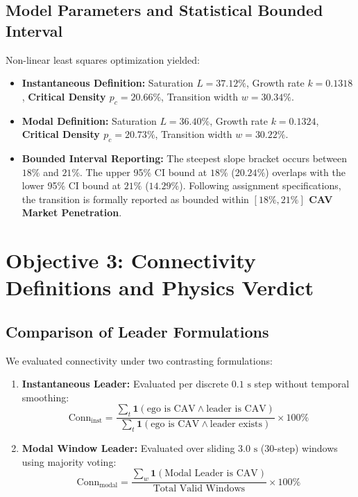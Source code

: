 \documentclass[11pt,a4paper]{article}
\begin{document}
\subsection{Model Parameters and Statistical Bounded Interval}
Non-linear least squares optimization yielded:
\begin{itemize}[leftmargin=1.5em, itemsep=2pt]
    \item \textbf{Instantaneous Definition:} Saturation $L = 37.12\%$, Growth rate $k = 0.1318$, \textbf{Critical Density $p_c = 20.66\%$}, Transition width $w = 30.34\%$.
    \item \textbf{Modal Definition:} Saturation $L = 36.40\%$, Growth rate $k = 0.1324$, \textbf{Critical Density $p_c = 20.73\%$}, Transition width $w = 30.22\%$.
    \item \textbf{Bounded Interval Reporting:} The steepest slope bracket occurs between $18\%$ and $21\%$. The upper 95\% CI bound at $18\%$ ($20.24\%$) overlaps with the lower 95\% CI bound at $21\%$ ($14.29\%$). Following assignment specifications, the transition is formally reported as bounded within \textbf{$[18\%, 21\%]$ CAV Market Penetration}.
\end{itemize}

\vspace{0.8em}

\section{Objective 3: Connectivity Definitions and Physics Verdict}

\subsection{Comparison of Leader Formulations}
We evaluated connectivity under two contrasting formulations:
\begin{enumerate}[leftmargin=1.5em, itemsep=2pt]
    \item \textbf{Instantaneous Leader:} Evaluated per discrete $0.1\text{ s}$ step without temporal smoothing:
    \begin{equation}
        \text{Conn}_{\text{inst}} = \frac{\sum_t \mathbf{1}(\text{ego is CAV} \land \text{leader is CAV})}{\sum_t \mathbf{1}(\text{ego is CAV} \land \text{leader exists})} \times 100\%
    \end{equation}
    \item \textbf{Modal Window Leader:} Evaluated over sliding $3.0\text{ s}$ ($30$-step) windows using majority voting:
    \begin{equation}
        \text{Conn}_{\text{modal}} = \frac{\sum_w \mathbf{1}(\text{Modal Leader is CAV})}{\text{Total Valid Windows}} \times 100\%
    \end{equation}
\end{enumerate}
\end{document}
